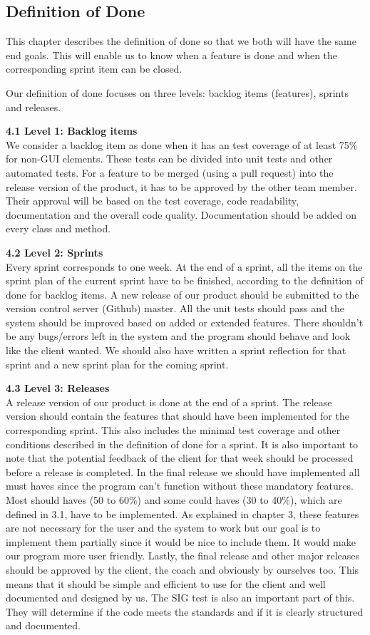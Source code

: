 \subsection{Definition of Done}
This chapter describes the definition of done so that we both will have the same end goals. This will enable us to know when a feature is done and when the corresponding sprint item can be closed.

Our definition of done focuses on three levels: backlog items (features), sprints and releases.

\textbf{4.1 Level 1: Backlog items} \\
We consider a backlog item as done when it has an test coverage of at least 75\% for non-GUI elements. These tests can be divided into unit tests and other automated tests. For a feature to be merged (using a pull request) into the release version of the product, it has to be approved by the other team member. Their approval will be based on the test coverage, code readability, documentation and the overall code quality. Documentation should be added on every class and method. 

\textbf{4.2 Level 2: Sprints} \\
Every sprint corresponds to one week. At the end of a sprint, all the items on the sprint plan of the current sprint have to be finished, according to the definition of done for backlog items. A new release of our product should be submitted to the version control server (Github) master. All the unit tests should pass and the system should be improved based on added or extended features. There shouldn't be any bugs/errors left in the system and the program should behave and look like the client wanted. We should also have written a sprint reflection for that sprint and a new sprint plan for the coming sprint. 

\textbf{4.3 Level 3: Releases}\\
A release version of our product is done at the end of a sprint. The release version should contain the features that should have been implemented for the corresponding sprint. This also includes the minimal test coverage and other conditions described in the definition of done for a sprint. It is also important to note that the potential feedback of the client for that week should be processed before a release is completed.
In the final release we should have implemented all must haves since the program can't function without these mandatory features. Most should haves (50 to 60\%) and some could haves (30 to 40\%), which are defined in 3.1, have to be implemented. As explained in chapter 3, these features are not necessary for the user and the system to work but our goal is to implement them partially since it would be nice to include them. It would make our program more user friendly. 
Lastly, the final release and other major releases should be approved by the client, the coach and obviously by ourselves too. This means that it should be simple and efficient to use for the client and well documented and designed by us. The SIG test is also an important part of this. They will determine if the code meets the standards and if it is clearly structured and documented. 

